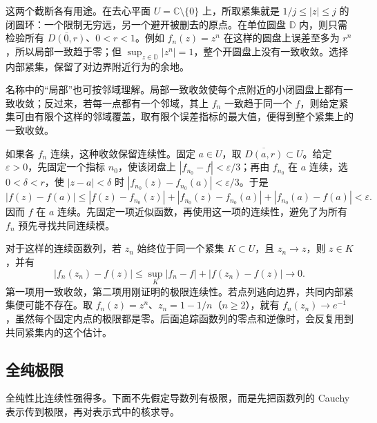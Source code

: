 \ProseParagraphBreak

这两个截断各有用途。在去心平面 \(U=\mathbb C\setminus\{0\}\) 上，所取紧集就是 \(1/j\le|z|\le j\) 的闭圆环：一个限制无穷远，另一个避开被删去的原点。在单位圆盘 \(\mathbb D\) 内，则只需检验所有 \(\overline{D(0,r)}\)、\(0<r<1\)。例如 \(f_n(z)=z^n\) 在这样的圆盘上误差至多为 \(r^n\)，所以局部一致趋于零；但 \(\sup_{z\in\mathbb D}|z^n|=1\)，整个开圆盘上没有一致收敛。选择内部紧集，保留了对边界附近行为的余地。

\ProseParagraphBreak

名称中的“局部”也可按邻域理解。局部一致收敛使每个点附近的小闭圆盘上都有一致收敛；反过来，若每一点都有一个邻域，其上 \(f_n\) 一致趋于同一个 \(f\)，则给定紧集可由有限个这样的邻域覆盖，取有限个误差指标的最大值，便得到整个紧集上的一致收敛。

\ProseParagraphBreak

如果各 \(f_n\) 连续，这种收敛保留连续性。固定 \(a\in U\)，取 \(\overline{D(a,r)}\subset U\)。给定 \(\varepsilon>0\)，先固定一个指标 \(n_0\)，使该闭盘上 \(|f_{n_0}-f|<\varepsilon/3\)；再由 \(f_{n_0}\) 在 \(a\) 连续，选 \(0<\delta<r\)，使 \(|z-a|<\delta\) 时 \(|f_{n_0}(z)-f_{n_0}(a)|<\varepsilon/3\)。于是
\[
 |f(z)-f(a)|
 \le |f(z)-f_{n_0}(z)|
     +|f_{n_0}(z)-f_{n_0}(a)|
     +|f_{n_0}(a)-f(a)|<\varepsilon.
\]
因而 \(f\) 在 \(a\) 连续。先固定一项近似函数，再使用这一项的连续性，避免了为所有 \(f_n\) 预先寻找共同连续模。

\ProseParagraphBreak

对于这样的连续函数列，若 \(z_n\) 始终位于同一个紧集 \(K\subset U\)，且 \(z_n\to z\)，则 \(z\in K\)，并有
\[
 |f_n(z_n)-f(z)|\le\sup_K|f_n-f|+|f(z_n)-f(z)|\longrightarrow0.
\]
第一项用一致收敛，第二项用刚证明的极限连续性。若点列逃向边界，共同内部紧集便可能不存在。取 \(f_n(z)=z^n\)、\(z_n=1-1/n\)（\(n\ge2\)），就有 \(f_n(z_n)\to e^{-1}\)，虽然每个固定内点的极限都是零。后面追踪函数列的零点和逆像时，会反复用到共同紧集内的这个估计。

\subsection{全纯极限}
\label{b3:subsec:040102}

全纯性比连续性强得多。下面不先假定导数列有极限，而是先把函数列的 Cauchy 表示传到极限，再对表示式中的核求导。

